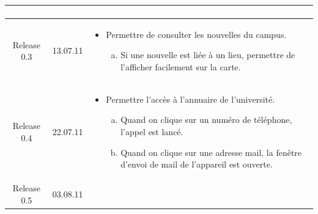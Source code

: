 \begin{longtable}{|c|l|p{10cm}|}
\begin{itemize}
\begin{enumerate}[a)]
	 	 			\end{enumerate}
		 	\end{itemize}   \\ 
		 \hline  Release 0.3 & 13.07.11  & 
 		 	\begin{itemize}
 		 	 		\item Permettre de consulter les nouvelles du campus.
	 		 	 	\begin{enumerate}[a)]
	 		 	 			\item Si une nouvelle est liée à un lieu, permettre de l'afficher facilement sur la carte.
	 		 	 		\end{enumerate}
 		 	\end{itemize}   \\
		\hline  Release 0.4 & 22.07.11  & 
				\begin{itemize}
 		 	 		\item Permettre l'accès à l'annuaire de l'université. 
	 		 	 	\begin{enumerate}[a)]
		 	 				\item Quand on clique sur un numéro de téléphone, l'appel est lancé.
		 	 				\item Quand on clique sur une adresse mail, la fenêtre d'envoi de mail de l'appareil est ouverte.
		 	 			\end{enumerate}
 		 	\end{itemize}   \\
		\hline  Release 0.5 & 03.08.11  & 
 		 

\end{longtable}
